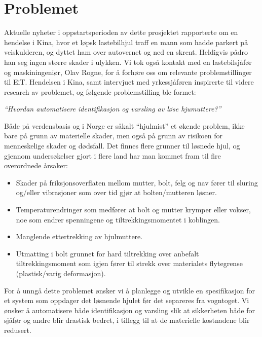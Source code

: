 \section{Problemet}

Aktuelle nyheter i oppstartsperioden av dette prosjektet rapporterte om en 
hendelse i Kina, hvor et løpsk lastebilhjul traff en mann som hadde parkert på 
veiskulderen, og dyttet ham over autovernet og ned en skrent. Heldigvis pådro 
han seg ingen større skader i ulykken. Vi tok også kontakt med en lastebilsjåfør
 og maskiningeniør, Olav Rogne, for å forhøre oss om relevante problemstillinger 
til EiT. Hendelsen i Kina, samt intervjuet med yrkessjåføren inspirerte til videre
research av problemet, og følgende problemstilling ble formet:

\begin{center}
\emph{``Hvordan automatisere identifikasjon og varsling av løse hjumuttere?''}
\end{center}

Både på verdensbasis og i Norge er såkalt ``hjulmist'' \cite{hjulmist} et økende problem, ikke bare 
på grunn av materielle skader, men også på grunn av risikoen for menneskelige 
skader og dødsfall. Det finnes flere grunner til løsnede hjul, og gjennom undersøkelser 
gjort i flere land har man kommet fram til fire overordnede årsaker:

\begin{itemize}
\item{ Skader på friksjonsoverflaten mellom mutter, bolt, felg og nav fører til sluring og/eller
vibrasjoner som over tid gjør at bolten/mutteren løsner.}
\item { Temperaturendringer som medfører at bolt og mutter krymper eller vokser, noe som 
endrer spenningene og tiltrekkingsmomentet i koblingen.}
\item{ Manglende ettertrekking av hjulmuttere.}
\item{ Utmatting i bolt grunnet for hard tiltrekking over anbefalt tiltrekkingsmoment som igjen 
fører til strekk over materialets flytegrense (plastisk/varig deformasjon).}
\end{itemize}

For å unngå dette problemet ønsker vi å planlegge og utvikle en spesifikasjon for et system som oppdager 
det løsnende hjulet før det separeres fra vogntoget. Vi ønsker å automatisere både identifikasjon
og varsling slik at sikkerheten både for sjåfør og andre blir drastisk bedret, i tillegg til at de materielle
kostnadene blir redusert.
